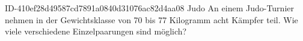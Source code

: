\begin{exercise}
      {ID-410ef28d49587cd7891a0840d31076ac82d4aa08}
      {Judo}
  \ifproblem\problem
    An einem Judo-Turnier nehmen in der Gewichtsklasse von 70 bis 77 Kilogramm
    acht Kämpfer teil. Wie viele verschiedene Einzelpaarungen sind möglich?
  \fi
\end{exercise}
